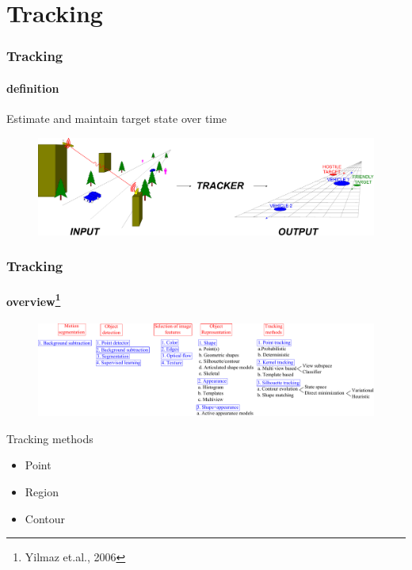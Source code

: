 \section{Tracking}
\begin{frame}
\frametitle{Tracking}
\framesubtitle{definition}
\logoCSIPCPL\mypagenum
	Estimate and maintain {\color{red}target state} over {\color{red}time}
	\begin{figure}
		\includegraphics[width=1.0\textwidth]{thesis/TRK_overviewDiagram.pdf}
	\end{figure}
\end{frame}


\begin{frame}[plain]
\frametitle{Tracking}
\framesubtitle{overview\tiny{\footnote {Yilmaz et.al., 2006}}}
\logoCSIPCPL\mypagenum
	\begin{changemargin}{-1.3in}{0in}
		\begin{figure}
			\includegraphics[width=1.3\textwidth]{thesis/TRK_overview.pdf}
		\end{figure}	
	\end{changemargin}
	\begin{block}{Tracking methods}
		\begin{itemize}
			\item Point
			\item Region
			\item Contour
		\end{itemize}
	\end{block}
\end{frame}



